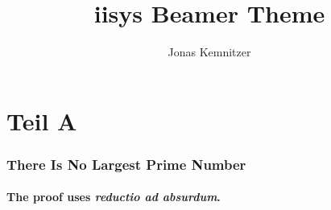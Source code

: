 \documentclass[12pt]{beamer}
\title{iisys Beamer Theme}
\author{Jonas Kemnitzer}
\institute{FG Intelligente \& Lernende Systeme}
\begin{document}
    \begin{frame}
        \titlepage{}
    \end{frame}


    \section{Teil A}
    \begin{frame}
        \frametitle{There Is No Largest Prime Number}
        \framesubtitle{The proof uses \textit{reductio ad absurdum}.}
    \end{frame}
\end{document}

